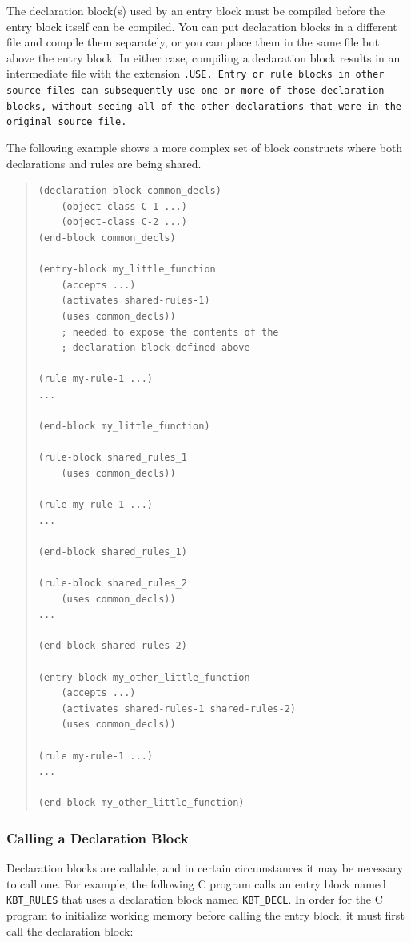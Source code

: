 The declaration block(s) used by an entry block must be compiled
before the entry block itself can be compiled. You can put declaration
blocks in a different file and compile them separately, or you can
place them in the same file but above the entry block. In either case,
compiling a declaration block results in an intermediate file with the
extension \tt{.USE}. Entry or rule blocks in other source files can
subsequently use one or more of those declaration blocks, without
seeing all of the other declarations that were in the original source
file.

The following example shows a more complex set of block constructs where both
declarations and rules are being shared.

\begin{quote}
\begin{verbatim}
(declaration-block common_decls)
    (object-class C-1 ...)
    (object-class C-2 ...)
(end-block common_decls)

(entry-block my_little_function
    (accepts ...)
    (activates shared-rules-1)
    (uses common_decls))
    ; needed to expose the contents of the
    ; declaration-block defined above

(rule my-rule-1 ...)
...

(end-block my_little_function)

(rule-block shared_rules_1
    (uses common_decls))

(rule my-rule-1 ...)
...

(end-block shared_rules_1)

(rule-block shared_rules_2
    (uses common_decls))
...

(end-block shared-rules-2)

(entry-block my_other_little_function
    (accepts ...)
    (activates shared-rules-1 shared-rules-2)
    (uses common_decls))

(rule my-rule-1 ...)
...

(end-block my_other_little_function)
\end{verbatim}
\end{quote}

\subsubsection*{Calling a Declaration Block}

Declaration blocks are callable, and in certain circumstances it may
be necessary to call one. For example, the following C program calls
an entry block named \verb|KBT_RULES| that uses a declaration block
named \verb|KBT_DECL|. In order for the C program to initialize
working memory before calling the entry block, it must first call the
declaration block:

